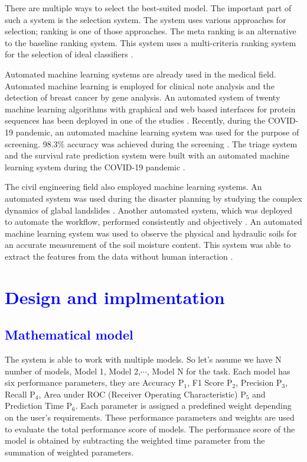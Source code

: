 \documentclass[a4paper,fleqn]{cas-dc}
\newcommand{\responsemodsm}[1]{\textcolor{blue}{#1}}
\newcommand{\sectionb}[1]{\section{\responsemodsm{#1}}}
\newcommand{\subsectionb}[1]{\subsection{\responsemodsm{#1}}}
\begin{document}
{    There are multiple ways to select the best-suited model. The important part of such a system is the selection system. The system uses various approaches for selection; ranking is one of those approaches. The meta ranking is an alternative to the baseline ranking system. This system uses a multi-criteria ranking system for the selection of ideal classifiers \cite{ref_paper_23}.
    
    Automated machine learning systems are already used in the medical field. Automated machine learning is employed for clinical note analysis \cite{ref_paper_a_2} and the detection of breast cancer \cite{ref_paper_a_6} by gene analysis. An automated system of twenty machine learning algorithms with graphical and web based interfaces for protein sequences has been deployed in one of the studies \cite{ref_paper_a_11}. Recently, during the COVID-19 pandemic, an automated machine learning system was used for the purpose of screening. 98.3\% accuracy was achieved during the screening \cite{ref_paper_a_15}. The triage system and the survival rate prediction system were built with an automated machine learning system during the COVID-19 pandemic \cite{ref_paper_a_9}.
    
    The civil engineering field also employed machine learning systems. An automated system was used during the disaster planning by studying the complex dynamics of glabal landslides \cite{ref_paper_a_10}. Another automated system, which was deployed to automate the workflow, performed consistently and objectively \cite{ref_paper_a_13}. An automated machine learning system was used to observe the physical and hydraulic soils for an accurate measurement of the soil moisture content. This system was able to extract the features from the data without human interaction \cite{ref_paper_a_8}.
}

\sectionb{Design and implmentation}\label{sec:design_and_implmentation}

\subsectionb{Mathematical model}\label{subsec:mathematical_model}

The system is able to work with multiple models. So let's assume we have N number of models, Model 1, Model 2,$\cdots$, Model N for the task. Each model has six performance parameters, they are Accuracy P$_1$, F1 Score P$_2$, Precision P$_3$, Recall P$_4$, Area under ROC (Receiver Operating Characteristic) P$_5$ and Prediction Time P$_6$. Each parameter is assigned a predefined weight depending on the user's requirements. These performance parameters and weights are used to evaluate the total performance score of models. The performance score of the model is obtained by subtracting the weighted time parameter from the summation of weighted parameters.
\end{document}
